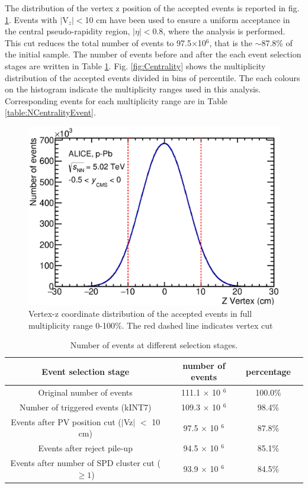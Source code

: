 The distribution of the vertex z position of the accepted events is reported in fig. \ref{fig:VzDistribution}. Events with $|$V$_{z}|<$10 cm have been used to ensure a uniform acceptance in the central pseudo-rapidity region, $|\eta|<$0.8, where the analysis is performed. This cut reduces the total number of events to 97.5$\times$10$^{6}$, that is the $\sim$87.8\% of the initial sample. The number of events before and after the each event selection stages are written in Table \ref{table:NEvent}.  Fig. \ref{fig:Centrality} shows the multiplicity distribution of the accepted events divided in bins of percentile. The each colours on the histogram indicate the multiplicity ranges used in this analysis. Corresponding events for each multiplicity range are in Table \ref{table:NCentralityEvent}. 

\begin{figure}[htbp]
\begin{center}
\includegraphics[width=10.cm]{./Version1/FigChapter5/Selection/VertexZ.eps}
\caption{Vertex-z coordinate distribution of the accepted events in full multiplicity range 0-100\%. The red dashed line indicates vertex cut }
\label{fig:VzDistribution}
\end{center}
\end{figure}

\begin{table}[htp]
\begin{center}
\begin{tabular}{|c|c|c|c|}
\hline
Event selection stage & number of events & percentage\\
\hline
\hline
Original number of events &111.1 $\times$ 10 $^{6}$ &100.0\% \\
\hline
Number of triggered events (kINT7) &109.3 $\times$ 10 $^{6}$ &98.4\% \\
\hline
Events after PV position cut ($|$Vz$|$ $<$ 10 cm) & 97.5 $\times$ 10 $^{6}$ &87.8\% \\
\hline
Events after reject pile-up& 94.5 $\times$ 10 $^{6}$& 85.1\%\\
\hline
Events after number of SPD cluster cut ($\geq 1$)& 93.9 $\times$ 10 $^{6}$ &84.5\% \\
\hline
\end{tabular}
\caption{Number of events at different selection stages.}\label{table:NEvent}
\end{center}
\end{table}






